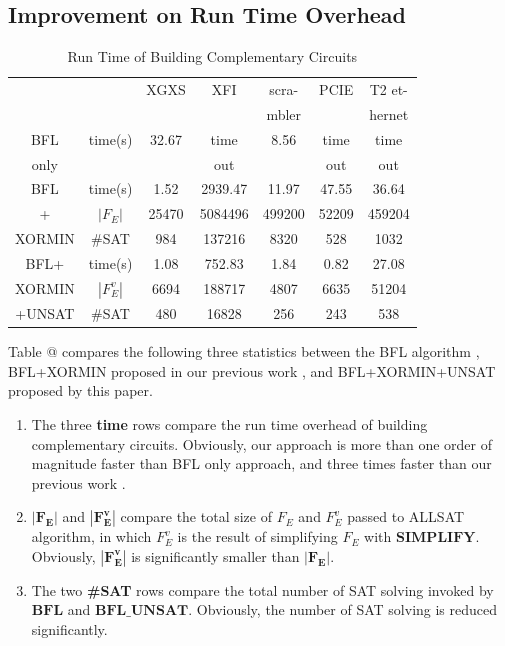\documentclass[journal]{IEEEtran}
\makeatletter
\newcommand{\Rmnum}[1]{\expandafter\@slowromancap\romannumeral #1@}
\makeatother
\begin{document}
\subsection{Improvement on Run Time Overhead}
\begin{table}[!t]
\centering
\caption{Run Time of Building Complementary Circuits}
\begin{tabular}{|c|c|c|c|c|c|c|}
\hline
            &&XGXS&XFI& scra-   &PCIE&T2 et-	  \\
            &&       &      & mbler&    &  hernet      	  \\ \hline
BFL    &time(s)&32.67   &time&8.56&time&time 		     \\
only&&&out&&out&out 		     \\ \hline
BFL    &time(s)&1.52   &2939.47&11.97     &47.55&36.64 		     \\ \cline{2-7}
+   &$|F_E|$&25470&5084496&499200&52209&459204\\ \cline{2-7}
XORMIN      &\#SAT&984&137216&8320&528&1032        	  \\ \hline
BFL+     &time(s)&1.08   &752.83 &1.84      &0.82& 27.08       	  \\ \cline{2-7}
XORMIN     &$|F_E^v|$&6694&188717&4807&6635&51204\\ \cline{2-7}
+UNSAT       &\#SAT&480&16828&256&243&538        	  \\ \hline
\end{tabular}
\end{table}
Table \Rmnum{3} compares the following three statistics between the BFL algorithm \cite{MINASS},
BFL+XORMIN proposed in our previous work \cite{ShegnYuShen:iccad09},
and BFL+XORMIN+UNSAT proposed by this paper.
\begin{enumerate}
\item The three \textbf{time} rows compare the run time overhead of building complementary circuits.
Obviously,
our approach is more than one order of magnitude faster than BFL only approach,
and three times faster than our previous work \cite{ShegnYuShen:iccad09}.
\item $\boldsymbol{|F_E|}$ and $\boldsymbol{|F_E^v|}$ compare the total size of $F_E$ and $F_E^v$ passed to ALLSAT algorithm,
in which $F_E^v$ is the result of simplifying $F_E$ with $\boldsymbol{SIMPLIFY}$.
Obviously,
$\boldsymbol{|F_E^v|}$ is significantly smaller than $\boldsymbol{|F_E|}$.
\item The two \textbf{\#SAT} rows compare the total number of SAT solving invoked by $\boldsymbol{BFL}$ and $\boldsymbol{BFL\_UNSAT}$.
Obviously,
the number of SAT solving is reduced significantly.
\end{enumerate}
\end{document}
